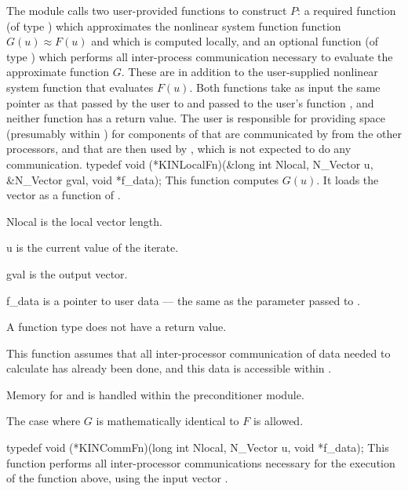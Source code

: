 The {\kinbbdpre} module calls two user-provided functions to construct $P$: 
a required function  (of type ) 
which approximates the nonlinear system function function $G(u) \approx F(u)$ and which 
is computed locally, and an optional function  (of type ) 
which performs all inter-process communication necessary to evaluate 
the approximate function $G$.  
These are in addition to the user-supplied nonlinear system function that 
evaluates $F(u)$.
Both functions take as input the same pointer  as that passed
by the user to  and passed to the user's function ,
and neither function has a return value. The user is responsible for
providing space (presumably within ) for components of 
that are communicated by  from the other processors, and that are
then used by , which is not expected to do any communication.
{
  typedef void (*KINLocalFn)(&long int Nlocal, N\_Vector u, \\
                             &N\_Vector gval, void *f\_data);
}
{
  This function computes $G(u)$. It loads the vector
   as a function of .  
}
{
  \begin{args}[Nlocal]
  \item[Nlocal] 
    is the local vector length.
  \item[u]
    is the current value of the iterate.
  \item[gval]
    is the output vector.
  \item[f\_data]
    is a pointer to user data --- the same as the       
    parameter passed to .  
  \end{args}
}
{
  A  function type does not have a return value.
}
{
  This function assumes that all inter-processor communication of data needed to 
  calculate  has already been done, and this data is accessible within
  .

   Memory for  and  is handled within the preconditioner module.

  The case where $G$ is mathematically identical to $F$ is allowed.
}
{
  typedef void (*KINCommFn)(long int Nlocal, N\_Vector u, void *f\_data);
}
{
  This function performs all inter-processor communications necessary 
  for the execution of the  function above, using the input vector .
}
